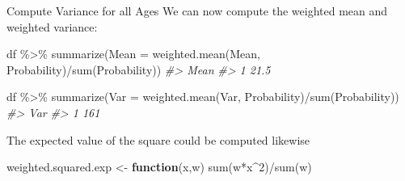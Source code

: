 \documentclass[
  11pt,
  ignorenonframetext,
  svgnames, handout, t]{beamer}
\newenvironment{Shaded}{\begin{snugshade}}{\end{snugshade}}
\newcommand{\AttributeTok}[1]{\textcolor[rgb]{0.77,0.63,0.00}{#1}}
\newcommand{\CommentTok}[1]{\textcolor[rgb]{0.56,0.35,0.01}{\textit{#1}}}
\newcommand{\ControlFlowTok}[1]{\textcolor[rgb]{0.13,0.29,0.53}{\textbf{#1}}}
\newcommand{\DecValTok}[1]{\textcolor[rgb]{0.00,0.00,0.81}{#1}}
\newcommand{\FunctionTok}[1]{\textcolor[rgb]{0.00,0.00,0.00}{#1}}
\newcommand{\NormalTok}[1]{#1}
\newcommand{\OtherTok}[1]{\textcolor[rgb]{0.56,0.35,0.01}{#1}}
\newcommand{\SpecialCharTok}[1]{\textcolor[rgb]{0.00,0.00,0.00}{#1}}
\begin{document}
\begin{frame}[fragile]{Compute Variance for all Ages}
\protect\hypertarget{compute-variance-for-all-ages-1}{}
We can now compute the weighted mean and weighted variance:

\footnotesize

\begin{Shaded}
\begin{Highlighting}[]
\NormalTok{df }\SpecialCharTok{\%\textgreater{}\%} \FunctionTok{summarize}\NormalTok{(}\AttributeTok{Mean =} \FunctionTok{weighted.mean}\NormalTok{(Mean, Probability)}\SpecialCharTok{/}\FunctionTok{sum}\NormalTok{(Probability))}
\CommentTok{\#\textgreater{}   Mean}
\CommentTok{\#\textgreater{} 1 21.5}

\NormalTok{df }\SpecialCharTok{\%\textgreater{}\%} \FunctionTok{summarize}\NormalTok{(}\AttributeTok{Var =} \FunctionTok{weighted.mean}\NormalTok{(Var, Probability)}\SpecialCharTok{/}\FunctionTok{sum}\NormalTok{(Probability))}
\CommentTok{\#\textgreater{}   Var}
\CommentTok{\#\textgreater{} 1 161}
\end{Highlighting}
\end{Shaded}

\normalsize

The expected value of the square could be computed likewise

\footnotesize

\begin{Shaded}
\begin{Highlighting}[]
\NormalTok{weighted.squared.exp }\OtherTok{\textless{}{-}} \ControlFlowTok{function}\NormalTok{(x,w) }\FunctionTok{sum}\NormalTok{(w}\SpecialCharTok{*}\NormalTok{x}\SpecialCharTok{\^{}}\DecValTok{2}\NormalTok{)}\SpecialCharTok{/}\FunctionTok{sum}\NormalTok{(w)}
\end{Highlighting}
\end{Shaded}

\normalsize
\end{frame}
\end{document}
